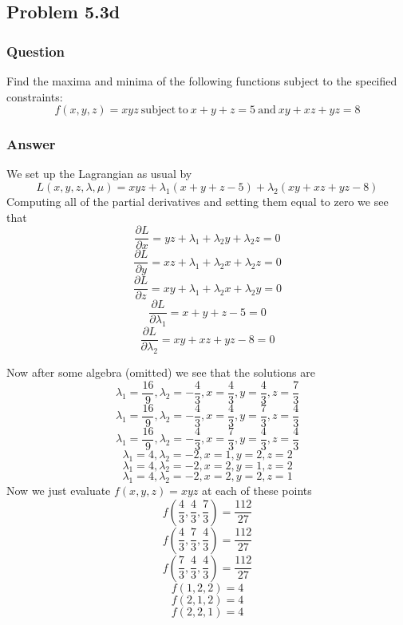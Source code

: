 \documentclass[12pt]{article}
\begin{document}
\subsection{Problem 5.3d}
\subsubsection{Question}
Find the maxima and minima of the following functions subject to the specified constraints:
\[f(x,y,z)=xyz \mathrm{\ subject\ to\ } x+y+z=5 \mathrm{\ and\ } xy+xz+yz=8\]


\subsubsection{Answer}

We set up the Lagrangian as usual by 
\[L(x,y,z,\lambda,\mu)= xyz + \lambda_1(x+y+z-5)+\lambda_2(xy+xz+yz-8)\]
Computing all of the partial derivatives and setting them equal to zero we see that
\begin{equation}\label{x1}\frac{\partial L}{\partial x}=yz+\lambda_1+\lambda_2 y +\lambda_2 z=0\end{equation}
\begin{equation}\label{y1}\frac{\partial L}{\partial y}=xz+\lambda_1+\lambda_2 x+ \lambda_2 z=0\end{equation}
\begin{equation}\label{z1}\frac{\partial L}{\partial z}=xy+\lambda_1 + \lambda_2 x+\lambda_2 y=0\end{equation}
\begin{equation}\label{2}\frac{\partial L}{\partial \lambda_1}=x+y+z-5=0\end{equation}
\begin{equation}\label{1}\frac{\partial L}{\partial \lambda_2}=xy+xz+yz-8=0\end{equation}

Now after some algebra (omitted) we see that the solutions are 
\[
\lambda _1= \frac{16}{9},\lambda _2= -\frac{4}{3},x= \frac{4}{3},y= \frac{4}{3},z= \frac{7}{3}
\]
\[
\lambda _1= \frac{16}{9},\lambda _2= -\frac{4}{3},x= \frac{4}{3},y= \frac{7}{3},z= \frac{4}{3}
\]
\[
\lambda _1= \frac{16}{9},\lambda _2= -\frac{4}{3},x= \frac{7}{3},y= \frac{4}{3},z= \frac{4}{3}
\]
\[
\lambda _1= 4,\lambda _2= -2,x= 1,y= 2,z= 2
\]
\[
\lambda _1= 4,\lambda _2= -2,x= 2,y= 1,z= 2
\]
\[
\lambda _1= 4,\lambda _2= -2,x= 2,y= 2,z= 1
\]
Now we just evaluate $f(x,y,z)=xyz$ at each of these points
\[f(\frac{4}{3},\frac{4}{3}, \frac{7}{3})=\frac{112}{27}
\]
\[f(\frac{4}{3}, \frac{7}{3}, \frac{4}{3})=\frac{112}{27}
\]
\[f(\frac{7}{3}, \frac{4}{3}, \frac{4}{3})=\frac{112}{27}
\]
\[f( 1, 2, 2)=4
\]
\[f( 2, 1, 2)=4
\]
\[f(2,2, 1)=4
\]
\end{document}
